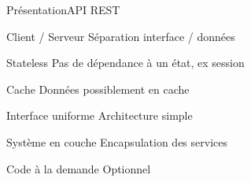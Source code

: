\begin{frame}{Présentation}{API REST}
    \begin{minipage}{0.45\textwidth}
        \begin{block}{Client / Serveur}
            Séparation interface / données
        \end{block}
    \end{minipage}
    \hfill
    \begin{minipage}{0.45\textwidth}
        \begin{block}{Stateless}
            Pas de dépendance à un état, ex session
        \end{block}
    \end{minipage}
    \hfill
    \begin{minipage}{0.45\textwidth}
        \begin{block}{Cache}
            Données possiblement en cache
        \end{block}
    \end{minipage}
    \hfill
    \begin{minipage}{0.45\textwidth}
        \begin{block}{Interface uniforme}
            Architecture simple
        \end{block}
    \end{minipage}
    \hfill
    \begin{minipage}{0.45\textwidth}
        \begin{block}{Système en couche}
            Encapsulation des services
        \end{block}
    \end{minipage}
    \hfill
    \begin{minipage}{0.45\textwidth}
        \begin{alertblock}{Code à la demande}
            \alert{Optionnel}
        \end{alertblock}
    \end{minipage}
\end{frame}